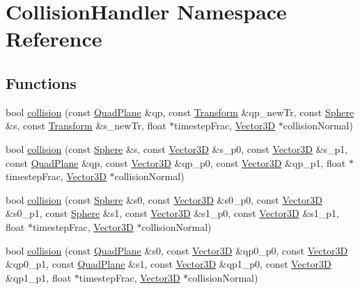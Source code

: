 \hypertarget{namespace_collision_handler}{\section{Collision\-Handler Namespace Reference}
\label{namespace_collision_handler}
}
\subsection*{Functions}
\begin{DoxyCompactItemize}
\item 
bool \hyperlink{namespace_collision_handler_a745096d27ac0c37c74f82334184b73db}{collision} (const \hyperlink{class_quad_plane}{Quad\-Plane} \&qp, const \hyperlink{class_transform}{Transform} \&qp\-\_\-new\-Tr, const \hyperlink{class_sphere}{Sphere} \&s, const \hyperlink{class_transform}{Transform} \&s\-\_\-new\-Tr, float $\ast$timestep\-Frac, \hyperlink{class_vector3_d}{Vector3\-D} $\ast$collision\-Normal)
\item 
bool \hyperlink{namespace_collision_handler_abdf4d543db8d5f6fc012ff91f31f2140}{collision} (const \hyperlink{class_sphere}{Sphere} \&s, const \hyperlink{class_vector3_d}{Vector3\-D} \&s\-\_\-p0, const \hyperlink{class_vector3_d}{Vector3\-D} \&s\-\_\-p1, const \hyperlink{class_quad_plane}{Quad\-Plane} \&qp, const \hyperlink{class_vector3_d}{Vector3\-D} \&qp\-\_\-p0, const \hyperlink{class_vector3_d}{Vector3\-D} \&qp\-\_\-p1, float $\ast$timestep\-Frac, \hyperlink{class_vector3_d}{Vector3\-D} $\ast$collision\-Normal)
\item 
bool \hyperlink{namespace_collision_handler_a1bfa74edc99009c5e18c44df30ead02f}{collision} (const \hyperlink{class_sphere}{Sphere} \&s0, const \hyperlink{class_vector3_d}{Vector3\-D} \&s0\-\_\-p0, const \hyperlink{class_vector3_d}{Vector3\-D} \&s0\-\_\-p1, const \hyperlink{class_sphere}{Sphere} \&s1, const \hyperlink{class_vector3_d}{Vector3\-D} \&s1\-\_\-p0, const \hyperlink{class_vector3_d}{Vector3\-D} \&s1\-\_\-p1, float $\ast$timestep\-Frac, \hyperlink{class_vector3_d}{Vector3\-D} $\ast$collision\-Normal)
\item 
bool \hyperlink{namespace_collision_handler_ac02fa6575701dd41985e32674370dbf2}{collision} (const \hyperlink{class_quad_plane}{Quad\-Plane} \&s0, const \hyperlink{class_vector3_d}{Vector3\-D} \&qp0\-\_\-p0, const \hyperlink{class_vector3_d}{Vector3\-D} \&qp0\-\_\-p1, const \hyperlink{class_quad_plane}{Quad\-Plane} \&s1, const \hyperlink{class_vector3_d}{Vector3\-D} \&qp1\-\_\-p0, const \hyperlink{class_vector3_d}{Vector3\-D} \&qp1\-\_\-p1, float $\ast$timestep\-Frac, \hyperlink{class_vector3_d}{Vector3\-D} $\ast$collision\-Normal)
\end{DoxyCompactItemize}


